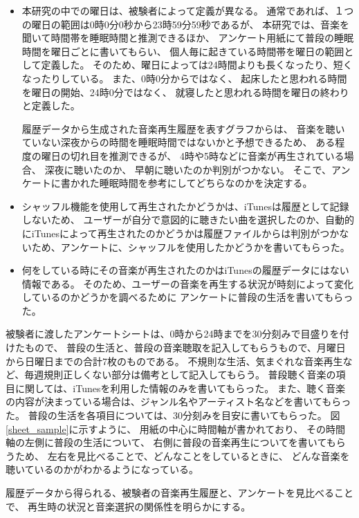 \documentclass[11pt, onecolumn]{jsarticle}
\begin{document}
\begin{itemize}

\item
本研究の中での曜日は、被験者によって定義が異なる。
通常であれば、１つの曜日の範囲は0時0分0秒から23時59分59秒であるが、
本研究では、音楽を聞いて時間帯を睡眠時間と推測できるほか、
アンケート用紙にて普段の睡眠時間を曜日ごとに書いてもらい、
個人毎に起きている時間帯を曜日の範囲として定義した。
そのため、曜日によっては24時間よりも長くなったり、短くなったりしている。
また、0時0分からではなく、
起床したと思われる時間を曜日の開始、24時0分ではなく、
就寝したと思われる時間を曜日の終わりと定義した。

履歴データから生成された音楽再生履歴を表すグラフからは、
音楽を聴いていない深夜からの時間を睡眠時間ではないかと予想できるため、
ある程度の曜日の切れ目を推測できるが、
4時や5時などに音楽が再生されている場合、
深夜に聴いたのか、
早朝に聴いたのか判別がつかない。
そこで、アンケートに書かれた睡眠時間を参考にしてどちらなのかを決定する。
\item
シャッフル機能を使用して再生されたかどうかは、iTunesは履歴として記録しないため、
ユーザーが自分で意図的に聴きたい曲を選択したのか、自動的にiTunesによって再生されたのかどうかは履歴ファイルからは判別がつかないため、アンケートに、シャッフルを使用したかどうかを書いてもらった。
\item
何をしている時にその音楽が再生されたのかはiTunesの履歴データにはない情報である。
そのため、ユーザーの音楽を再生する状況が時刻によって変化しているのかどうかを調べるために
アンケートに普段の生活を書いてもらった。
\end{itemize}


被験者に渡したアンケートシートは、0時から24時までを30分刻みで目盛りを付けたもので、
普段の生活と、普段の音楽聴取を記入してもらうもので、月曜日から日曜日までの合計7枚のものである。
不規則な生活、気まぐれな音楽再生など、毎週規則正しくない部分は備考として記入してもらう。
普段聴く音楽の項目に関しては、iTunesを利用した情報のみを書いてもらった。
また、聴く音楽の内容が決まっている場合は、ジャンル名やアーティスト名などを書いてもらった。
普段の生活を各項目については、30分刻みを目安に書いてもらった。
図\ref{sheet_sample}に示すように、
用紙の中心に時間軸が書かれており、
その時間軸の左側に普段の生活について、
右側に普段の音楽再生についてを書いてもらうため、
左右を見比べることで、どんなことをしているときに、
どんな音楽を聴いているのかがわかるようになっている。

履歴データから得られる、被験者の音楽再生履歴と、アンケートを見比べることで、
再生時の状況と音楽選択の関係性を明らかにする。
\end{document}
